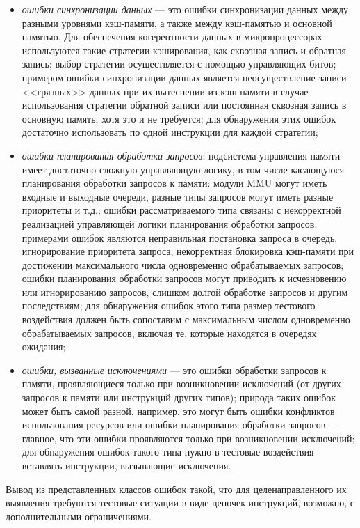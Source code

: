 \begin{itemize}
  \item \emph{ошибки синхронизации данных} --- это ошибки синхронизации данных между разными уровнями кэш-памяти, а также между кэш-памятью и основной памятью. Для обеспечения когерентности данных в микропроцессорах используются такие стратегии кэширования, как сквозная запись и обратная запись; выбор стратегии осуществляется с помощью управляющих битов; примером ошибки синхронизации данных является неосуществление записи <<грязных>> данных при их вытеснении из кэш-памяти в случае использования стратегии обратной записи или постоянная сквозная запись в основную память, хотя это и не требуется; для обнаружения этих ошибок достаточно использовать по одной инструкции для каждой стратегии;
  \item \emph{ошибки планирования обработки запросов}; подсистема управления памяти имеет достаточно сложную управляющую логику, в том числе касающуюся планирования обработки запросов к памяти: модули MMU могут иметь входные и выходные очереди, разные типы запросов могут иметь разные приоритеты и т.д.; ошибки рассматриваемого типа связаны с некорректной реализацией управляющей логики планирования обработки запросов; примерами ошибок являются неправильная постановка запроса в очередь, игнорирование приоритета запроса, некорректная блокировка кэш-памяти при достижении максимального числа одновременно обрабатываемых запросов; ошибки планирования обработки запросов могут приводить к исчезновению или игнорированию запросов, слишком долгой обработке запросов и другим последствиям; для обнаружения ошибок этого типа размер тестового воздействия должен быть сопоставим с максимальным числом одновременно обрабатываемых запросов, включая те, которые находятся в очередях ожидания;
  \item \emph{ошибки, вызванные исключениями} --- это ошибки обработки запросов к памяти, проявляющиеся только при возникновении исключений (от других запросов к памяти или инструкций других типов); природа таких ошибок может быть самой разной, например, это могут быть ошибки конфликтов использования ресурсов или ошибки планирования обработки запросов --- главное, что эти ошибки проявляются только при возникновении исключений; для обнаружения ошибок такого типа нужно в тестовые воздействия вставлять инструкции, вызывающие исключения.
\end{itemize}

Вывод из представленных классов ошибок такой, что для целенаправленного их выявления требуются тестовые ситуации в виде цепочек инструкций, возможно, с дополнительными ограничениями.

